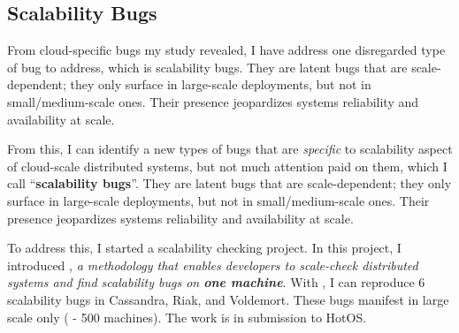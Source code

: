 \documentclass[11pt]{article}
\begin{document}
\subsection{Scalability Bugs}

From cloud-specific bugs my study revealed, I have address one disregarded type
of bug to address, which is scalability bugs. They are latent bugs that are
scale-dependent; they only surface in large-scale deployments, but not in
small/medium-scale ones. Their presence jeopardizes systems reliability and
availability at scale. 

From this, I can identify a new types of bugs that are \textit{specific} to
scalability aspect of cloud-scale distributed systems, but not much attention
paid on them, which I call ``\textbf{scalability bugs}''. They are latent bugs
that are scale-dependent; they only surface in large-scale deployments, but not
in small/medium-scale ones. Their presence jeopardizes systems reliability and
availability at scale. 
\fi 

To address this, I started a scalability checking project. In this project, I
introduced \sck, \textit{a methodology that enables developers to scale-check
distributed systems and find scalability bugs on \textbf{one machine}}. With
\sck, I can reproduce 6 scalability bugs in Cassandra, Riak, and Voldemort.
These bugs manifest in large scale only ( - 500 machines). The work is in
submission to HotOS.


\end{document}
